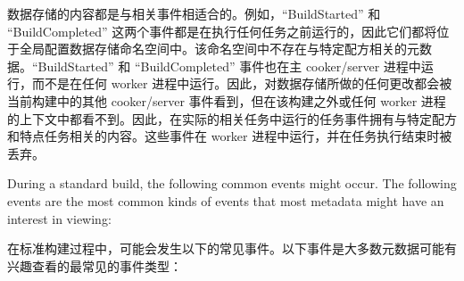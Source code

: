 数据存储的内容都是与相关事件相适合的。例如，``BuildStarted'' 和 ``BuildCompleted'' 这两个事件都是在执行任何任务之前运行的，因此它们都将位于全局配置数据存储命名空间中。该命名空间中不存在与特定配方相关的元数据。``BuildStarted'' 和 ``BuildCompleted'' 事件也在主 cooker/server 进程中运行，而不是在任何 worker 进程中运行。因此，对数据存储所做的任何更改都会被当前构建中的其他 cooker/server 事件看到，但在该构建之外或任何 worker 进程的上下文中都看不到。因此，在实际的相关任务中运行的任务事件拥有与特定配方和特点任务相关的内容。这些事件在 worker 进程中运行，并在任务执行结束时被丢弃。

During a standard build, the following common events might occur. The following events are the most common kinds of events that most metadata might have an interest in viewing:

在标准构建过程中，可能会发生以下的常见事件。以下事件是大多数元数据可能有兴趣查看的最常见的事件类型：

